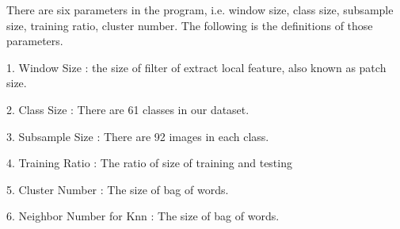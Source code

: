 \documentclass[final,leqno,onefignum,onetabnum]{siamltexmm}
\begin{document}
There are six parameters in the program, i.e. window size, class size, subsample size, training ratio,  cluster number.
The following is the definitions of those parameters.
\\ \par 1. Window Size : the size of filter of extract local feature, also known as patch size. 
\\ \par 2. Class Size : There are 61 classes in our dataset.
\\ \par 3. Subsample Size : There are 92 images in each class.
\\ \par 4. Training Ratio : The ratio of size of training and testing 
\\ \par 5. Cluster Number : The size of bag of words.
\\ \par 6. Neighbor Number for Knn : The size of bag of words.
\end{document}
